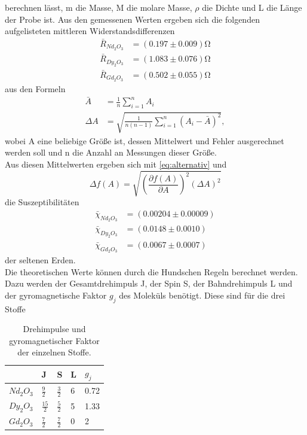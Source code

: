 berechnen lässt, m die Masse, M die molare Masse, $\rho$ die Dichte und L die Länge der Probe ist.
Aus den gemessenen Werten ergeben sich die folgenden aufgelisteten mittleren Widerstandsdifferenzen
\begin{align*}
  \bar R_{Nd_2 O_3}&=(0.197 \pm 0.009) \si{\ohm}\\
  \bar R_{Dy_2 O_3}&=(1.083 \pm 0.076) \si{\ohm}\\
  \bar R_{Gd_2 O_3}&=(0.502 \pm 0.055) \si{\ohm}
\end{align*}
aus den Formeln
\begin{align*}
  \bar A&=\frac{1}{n}\sum_{i=1}^n A_i\\
  \Delta A&=\sqrt{\frac{1}{n(n-1)}\sum_{i=1}^n (A_i - \bar A)^2},
  \label{fehler}
\end{align*}
wobei A eine beliebige Größe ist, dessen Mittelwert und Fehler ausgerechnet werden soll und n die Anzahl an Messungen dieser Größe.\\
Aus diesen Mittelwerten ergeben sich mit \autoref{eq:alternativ} und    
\begin{equation}
  \Delta f(A)=\sqrt{\left(\frac{\partial f(A)}{\partial A}\right)^2 (\Delta A)^2}
  \label{gauß}
\end{equation}
die Suszeptibilitäten 
\begin{align*}
  \bar \chi_{Nd_2 O_3}&=(0.00204 \pm 0.00009)\\
  \bar \chi_{Dy_2 O_3}&=(0.0148 \pm 0.0010)\\
  \bar \chi_{Gd_2 O_3}&=(0.0067 \pm 0.0007)
\end{align*}
der seltenen Erden.\\
Die theoretischen Werte können durch die Hundschen Regeln berechnet werden. Dazu werden der Gesamtdrehimpuls J, der Spin S, der Bahndrehimpuls L und der gyromagnetische Faktor $g_j$ des Moleküls benötigt. Diese sind für die drei Stoffe
\begin{table}[H]
  \centering
  \caption{Drehimpulse und gyromagnetischer Faktor der einzelnen Stoffe.}
  \begin{tabular}{l|l|l|l|l}
   & J & S & L & $g_j$\\ \hline
   $Nd_2 O_3$ & $\frac{9}{2}$ & $\frac{3}{2}$ & 6 & 0.72\\ \hline
   $Dy_2 O_3$ & $\frac{15}{2}$ & $\frac{5}{2}$ & 5 & 1.33\\ \hline
   $Gd_2 O_3$ & $\frac{7}{2}$ & $\frac{7}{2}$ & 0 & 2\\ \hline
   \end{tabular}
\end{table}
